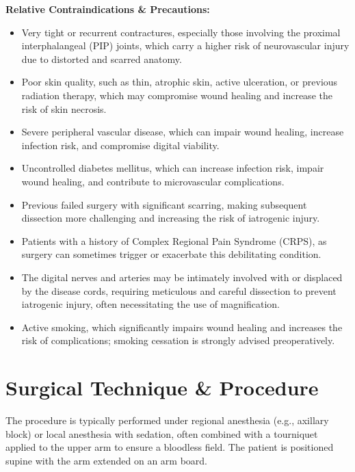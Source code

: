 \textbf{Relative Contraindications \& Precautions:}
\begin{itemize}
  \item Very tight or recurrent contractures, especially those involving the proximal interphalangeal (PIP) joints, which carry a higher risk of neurovascular injury due to distorted and scarred anatomy.
  \item Poor skin quality, such as thin, atrophic skin, active ulceration, or previous radiation therapy, which may compromise wound healing and increase the risk of skin necrosis.
  \item Severe peripheral vascular disease, which can impair wound healing, increase infection risk, and compromise digital viability.
  \item Uncontrolled diabetes mellitus, which can increase infection risk, impair wound healing, and contribute to microvascular complications.
  \item Previous failed surgery with significant scarring, making subsequent dissection more challenging and increasing the risk of iatrogenic injury.
  \item Patients with a history of Complex Regional Pain Syndrome (CRPS), as surgery can sometimes trigger or exacerbate this debilitating condition.
  \item The digital nerves and arteries may be intimately involved with or displaced by the disease cords, requiring meticulous and careful dissection to prevent iatrogenic injury, often necessitating the use of magnification.
  \item Active smoking, which significantly impairs wound healing and increases the risk of complications; smoking cessation is strongly advised preoperatively.
\end{itemize}

\section*{Surgical Technique \& Procedure}
The procedure is typically performed under regional anesthesia (e.g., axillary block) or local anesthesia with sedation, often combined with a tourniquet applied to the upper arm to ensure a bloodless field. The patient is positioned supine with the arm extended on an arm board.

